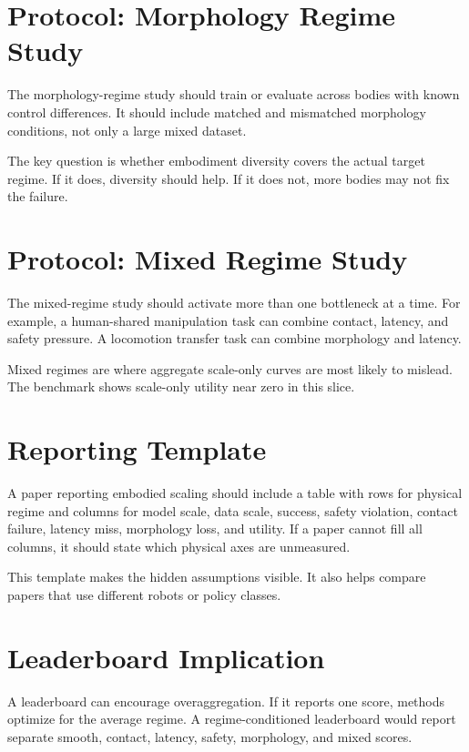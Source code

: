 \section{Protocol: Morphology Regime Study}

The morphology-regime study should train or evaluate across bodies with known control differences. It should include matched and mismatched morphology conditions, not only a large mixed dataset.

The key question is whether embodiment diversity covers the actual target regime. If it does, diversity should help. If it does not, more bodies may not fix the failure.

\section{Protocol: Mixed Regime Study}

The mixed-regime study should activate more than one bottleneck at a time. For example, a human-shared manipulation task can combine contact, latency, and safety pressure. A locomotion transfer task can combine morphology and latency.

Mixed regimes are where aggregate scale-only curves are most likely to mislead. The benchmark shows scale-only utility near zero in this slice.

\section{Reporting Template}

A paper reporting embodied scaling should include a table with rows for physical regime and columns for model scale, data scale, success, safety violation, contact failure, latency miss, morphology loss, and utility. If a paper cannot fill all columns, it should state which physical axes are unmeasured.

This template makes the hidden assumptions visible. It also helps compare papers that use different robots or policy classes.

\section{Leaderboard Implication}

A leaderboard can encourage overaggregation. If it reports one score, methods optimize for the average regime. A regime-conditioned leaderboard would report separate smooth, contact, latency, safety, morphology, and mixed scores.

